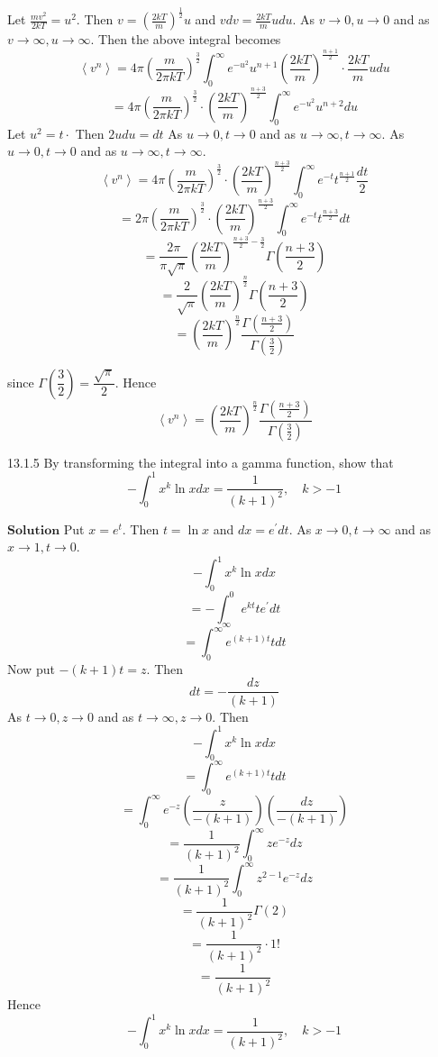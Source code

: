 \documentclass{article}
\begin{document}
\begin{flushleft}
Let $\frac{m v^{2}}{2 k T}=u^{2} .$ Then $v=\left(\frac{2 k T}{m}\right)^{\frac{1}{2}} u$ and $v d v=\frac{2 k T}{m} u d u$. As $v \rightarrow 0, u \rightarrow 0$ and as $v \rightarrow \infty, u \rightarrow \infty$. Then the above integral becomes
$$
\left\langle v^{n}\right\rangle=4 \pi\left(\frac{m}{2 \pi k T}\right)^{\frac{3}{2}} \int_{0}^{\infty} e^{-u^{2}} u^{n+1}\left(\frac{2 k T}{m}\right)^{\frac{n+1}{2}} \cdot \frac{2 k T}{m} u d u
$$
$$
=4 \pi\left(\frac{m}{2 \pi k T}\right)^{\frac{3}{2}} \cdot\left(\frac{2 k T}{m}\right)^{\frac{n+3}{2}} \int_{0}^{\infty} e^{-u^{2}} u^{n+2} d u
$$
Let $u^{2}=t \cdot$ Then $2 u d u=d t$ As $u \rightarrow 0, t \rightarrow 0$ and as $u \rightarrow \infty, t \rightarrow \infty$. As $u \rightarrow 0, t \rightarrow 0$ and as $u \rightarrow \infty, t \rightarrow \infty$.
$$
\left\langle v^{n}\right\rangle=4 \pi\left(\frac{m}{2 \pi k T}\right)^{\frac{3}{2}} \cdot\left(\frac{2 k T}{m}\right)^{\frac{n+3}{2}} \int_{0}^{\infty} e^{-t} t^{\frac{n+1}{2}} \frac{d t}{2}
$$
$$
=2 \pi\left(\frac{m}{2 \pi k T}\right)^{\frac{3}{2}} \cdot\left(\frac{2 k T}{m}\right)^{\frac{n+3}{2}} \int_{0}^{\infty} e^{-t} t^{\frac{n+3}{2}} d t
$$
$$
=\frac{2 \pi}{\pi \sqrt{\pi}}\left(\frac{2 k T}{m}\right)^{\frac{n+3}{2}-\frac{3}{2}} \Gamma\left(\frac{n+3}{2}\right)
$$
$$
=\frac{2}{\sqrt{\pi}}\left(\frac{2 k T}{m}\right)^{\frac{n}{2}} \Gamma\left(\frac{n+3}{2}\right)
$$
$$
=\left(\frac{2 k T}{m}\right)^{\frac{n}{2}} \frac{\Gamma\left(\frac{n+3}{2}\right)}{\Gamma\left(\frac{3}{2}\right)}
$$


since $\Gamma\left(\dfrac{3}{2}\right)=\dfrac{\sqrt{\pi}}{2}$. Hence 
$$\left\langle v^{n}\right\rangle=\left(\dfrac{2 k T}{m}\right)^{\frac{n}{2}} \frac{\Gamma\left(\frac{n+3}{2}\right)}{\Gamma\left(\frac{3}{2}\right)}$$

\newpage


\begin{mybox}{13.1.5}
By transforming the integral into a gamma function, show that
$$
-\int_{0}^{1} x^{k} \ln x d x=\frac{1}{(k+1)^{2}}, \quad k>-1
$$
\end{mybox}

$\boxed{\textbf{Solution}}$ Put $x=e^{t} .$ Then $t=\ln x$ and $d x=e^{\prime} d t$. As $x \rightarrow 0, t \rightarrow \infty$ and as $x \rightarrow 1, t \rightarrow 0$.
$$-\int_{0}^{1} x^{k} \ln x d x$$
$$=-\int_{\infty}^{0} e^{k t} t e^{\prime} d t$$
$$=\int_{0}^{\infty} e^{(k+1) t} t d t$$
Now put $-(k+1) t=z .$ Then 
$$d t=-\frac{d z}{(k+1)} $$
As $t \rightarrow 0, z \rightarrow 0$ and as $t \rightarrow \infty, z \rightarrow 0$. Then
$$-\int_{0}^{1} x^{k} \ln x d x$$
$$=\int_{0}^{\infty} e^{(k+1) t} t d t$$
$$=\int_{0}^{\infty} e^{-z}\left(\frac{z}{-(k+1)}\right)\left(\frac{d z}{-(k+1)}\right)$$
$$=\frac{1}{(k+1)^{2}} \int_{0}^{\infty} z e^{-z} d z$$
$$=\frac{1}{(k+1)^{2}} \int_{0}^{\infty} z^{2-1} e^{-z} d z$$
$$=\frac{1}{(k+1)^{2}} \Gamma(2)$$
$$=\frac{1}{(k+1)^{2}} \cdot 1 !$$
$$=\frac{1}{(k+1)^{2}}$$
Hence
$$
-\int_{0}^{1} x^{k} \ln x d x=\frac{1}{(k+1)^{2}}, \quad k>-1
$$


\end{flushleft}
\end{document}
